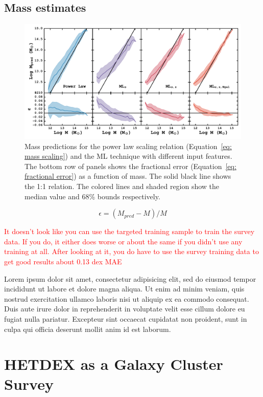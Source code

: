 \documentclass[apj, revtex4]{emulateapj}
\newcommand{\editorial}[1]{\textcolor{red}{#1}}
\begin{document}
\subsection{Mass estimates}
\begin{figure} 
	\includegraphics[width=\textwidth]{MLcomparison.pdf} 
	\caption{Mass predictions for the power law scaling relation (Equation~\ref{eq: mass scaling}) and the ML technique with different input features. The bottom row of panels shows the fractional error (Equation~\ref{eq: fractional error}) as a function of mass. The solid black line shows the 1:1 relation. The colored lines and shaded region show the median value and 68\% bounds respectively.} \label{fig: ML comparison} 
\end{figure}

\begin{equation}\label{eq: fractional error}
	\epsilon = (M_{pred} - M)/M
\end{equation}

\editorial{It doesn't look like you can use the targeted training sample to train the survey data. If you do, it either does worse or about the same if you didn't use any training at all. After looking at it, you do have to use the survey training data to get good results about 0.13 dex MAE
}


Lorem ipsum dolor sit amet, consectetur adipisicing elit, sed do eiusmod tempor incididunt ut labore et dolore magna aliqua. Ut enim ad minim veniam, quis nostrud exercitation ullamco laboris nisi ut aliquip ex ea commodo consequat. Duis aute irure dolor in reprehenderit in voluptate velit esse cillum dolore eu fugiat nulla pariatur. Excepteur sint occaecat cupidatat non proident, sunt in culpa qui officia deserunt mollit anim id est laborum.

\section{HETDEX as a Galaxy Cluster Survey}
\end{document}
